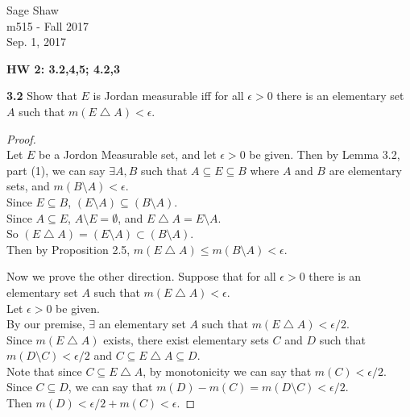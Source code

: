 \documentclass[12pt]{article}
\begin{document}
	\thispagestyle{empty}
	
\begin{flushright}
	Sage Shaw \\
	m515 - Fall 2017 \\
	Sep. 1, 2017
\end{flushright}
	
{\large \textbf{HW 2: 3.2,4,5; 4.2,3}}\bigbreak

\hspace{-4 ex}\textbf{3.2} Show that $E$ is Jordan measurable iff for all $\epsilon>0$ there is an elementary set $A$ such that $m(E\bigtriangleup A)<\epsilon$. \bigbreak

	\begin{proof}\text{ }\\
		Let $E$ be a Jordon Measurable set, and let $\epsilon >0$ be given. Then by Lemma 3.2, part (1), we can say $\exists A,B$ such that $A \subseteq E \subseteq B$ where $A$ and $B$ are elementary sets, and $m(B\setminus A)< \epsilon$. \\
		Since $E \subseteq B$, $(E \setminus A) \subseteq (B \setminus A)$. \\
		Since $A \subseteq E$, $A \setminus E = \emptyset$, and $E \bigtriangleup A = E \setminus A$. \\ 
		So $(E \bigtriangleup A) = (E \setminus A) \subset (B \setminus A)$.\\
		Then by Proposition 2.5, $m(E \bigtriangleup A) \leq m(B \setminus A) < \epsilon$.\bigbreak
		
		Now we prove the other direction. Suppose that for all $\epsilon>0$ there is an elementary set $A$ such that $m(E\bigtriangleup A)<\epsilon$.\\
		
		Let $\epsilon > 0$ be given. \\
		By our premise, $\exists $ an elementary set $A$ such that $m(E\bigtriangleup A)<\epsilon / 2$. \\
		Since $m(E \bigtriangleup A)$ exists, there exist elementary sets $C$ and $D$ such that \\
		$m(D \setminus C) < \epsilon/2$ and $C \subseteq E \bigtriangleup A \subseteq D$. \\
		Note that since $C \subseteq E \bigtriangleup A$, by monotonicity we can say that $m(C) < \epsilon/2$. \\
		Since $C \subseteq D$, we can say that $m(D)-m(C) = m(D \setminus C) < \epsilon/2$. \\
		Then $m(D) < \epsilon/2 + m(C) < \epsilon$. \bigbreak
		

\end{proof}
\end{document}
